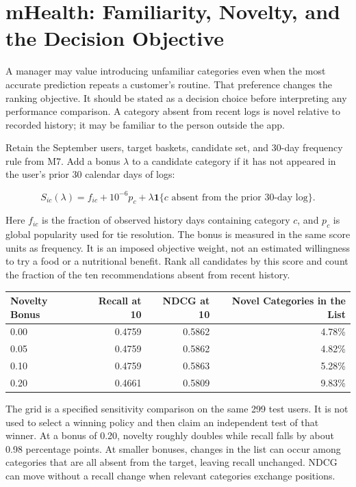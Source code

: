 \hypertarget{M08-mhealth-familiarity-novelty-and-the-decision-objective}{%
\section{mHealth: Familiarity, Novelty, and the Decision
Objective}\label{M08-mhealth-familiarity-novelty-and-the-decision-objective}}

\noindent A manager may value introducing unfamiliar categories even when the most
accurate prediction repeats a customer's routine. That preference
changes the ranking objective. It should be stated as a decision choice
before interpreting any performance comparison. A category absent from
recent logs is novel relative to recorded history; it may be familiar to
the person outside the app.

Retain the September users, target baskets, candidate set, and 30-day
frequency rule from M7. Add a bonus \(\lambda\) to a candidate category
if it has not appeared in the user's prior 30 calendar days of logs:

\[
S_{ic}(\lambda)=f_{ic}+10^{-6}p_c+
\lambda\mathbf{1}\{c\text{ absent from the prior 30-day log}\}.
\]

Here \(f_{ic}\) is the fraction of observed history days containing
category \(c\), and \(p_c\) is global popularity used for tie
resolution. The bonus is measured in the same score units as frequency.
It is an imposed objective weight, not an estimated willingness to try a
food or a nutritional benefit. Rank all candidates by this score and
count the fraction of the ten recommendations absent from recent
history.

\begin{table}[H]
\centering\small
\begin{tabular}{@{}lrrr@{}}
\toprule
Novelty Bonus & Recall at 10 & NDCG at 10 & Novel Categories in the
List \\
\midrule

0.00 & 0.4759 & 0.5862 & 4.78\% \\
0.05 & 0.4759 & 0.5862 & 4.82\% \\
0.10 & 0.4759 & 0.5863 & 5.28\% \\
0.20 & 0.4661 & 0.5809 & 9.83\% \\
\bottomrule
\end{tabular}
\end{table}

The grid is a specified sensitivity comparison on the same 299 test
users. It is not used to select a winning policy and then claim an
independent test of that winner. At a bonus of 0.20, novelty roughly
doubles while recall falls by about 0.98 percentage points. At smaller
bonuses, changes in the list can occur among categories that are all
absent from the target, leaving recall unchanged. NDCG can move without
a recall change when relevant categories exchange positions.

